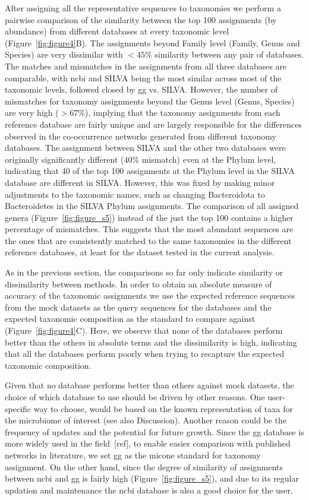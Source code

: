   After assigning all the representative sequences to taxonomies we perform a pairwise comparison of the similarity between the top 100 assignments (by abundance) from different databases at every taxonomic level (Figure~\ref{fig:figure4}B).
  The assignments beyond Family level (Family, Genus and Species) are very dissimilar with $<45\%$ similarity between any pair of databases.
  The matches and mismatches in the assignments from all three databases are comparable, with \ac{ncbi} and SILVA being the most similar across most of the taxonomic levels, followed closed by \ac{gg} vs. SILVA.
  However, the number of mismatches for taxonomy assignments beyond the Genus level (Genus, Species) are very high ($>67\%$), implying that the taxonomy assignments from each reference database are fairly unique and are largely responsible for the differences observed in the co-occurrence networks generated from different taxonomy databases.
  The assignment between SILVA and the other two databases were originally significantly different ($40\%$ mismatch) even at the Phylum level, indicating that 40 of the top 100 assignments at the Phylum level in the SILVA database are different in SILVA.
  However, this was fixed by making minor adjustments to the taxonomic names, such as changing Bacteroidota to Bacteroidetes in the SILVA Phylum assignments.
  The comparison of all assigned genera (Figure~\ref{fig:figure_s5}) instead of the just the top 100 contains a higher percentage of mismatches.
  This suggests that the most abundant sequences are the ones that are consistently matched to the same taxonomies in the different reference databases, at least for the dataset tested in the current analysis.

  As in the previous section, the comparisons so far only indicate similarity or dissimilarity between methods.
  In order to obtain an absolute measure of accuracy of the taxonomic assignments we use the expected reference sequences from the mock datasets as the query sequences for the databases and the expected taxonomic composition as the standard to compare against (Figure~\ref{fig:figure4}C).
  Here, we observe that none of the databases perform better than the others in absolute terms and the dissimilarity is high, indicating that all the databases perform poorly when trying to recapture the expected taxonomic composition.

  Given that no database performs better than others against mock datasets, the choice of which database to use should be driven by other reasons.
  One user-specific way to choose, would be based on the known representation of taxa for the microbiome of interest (see also Discussion). Another reason could be the frequency of updates and the potential for future growth.
  Since the \ac{gg} database is more widely used in the field~[ref], to enable easier comparison with published networks in literature, we set \ac{gg} as the \ac{micone} standard for taxonomy assignment.
  On the other hand, since the degree of similarity of assignments between \ac{ncbi} and \ac{gg} is fairly high (Figure~\ref{fig:figure_s5}), and due to its regular updation and maintenance the \ac{ncbi} database is also a good choice for the user.

